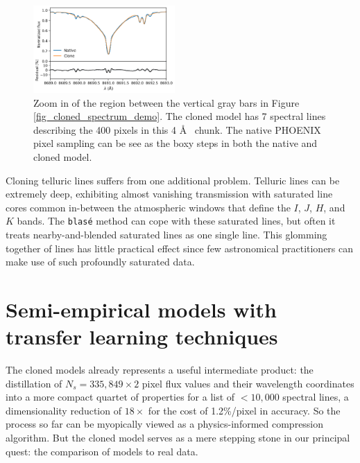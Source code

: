 \documentclass[twocolumn]{aastex631}
\begin{document}
\begin{figure}[hbt!]
    \centering
    \includegraphics[width=0.48\textwidth]{blase_clone_demo_zoom.png}
    \caption{Zoom in of the region between the vertical gray bars in Figure \ref{fig_cloned_spectrum_demo}. The cloned model has 7 spectral lines describing the 400 pixels in this 4 \AA~ chunk.  The native PHOENIX pixel sampling can be see as the boxy steps in both the native and cloned model.  }
    \label{fig_zoom_cloning_performance}
\end{figure}

Cloning telluric lines suffers from one additional problem.  Telluric lines can be extremely deep, exhibiting almost vanishing transmission with saturated line cores common in-between the atmospheric windows that define the $I$, $J$, $H$, and $K$ bands.  The \texttt{blas\'e} method can cope with these saturated lines, but often it treats nearby-and-blended saturated lines as one single line.  This glomming together of lines has little practical effect since few astronomical practitioners can make use of such profoundly saturated data.


\section{Semi-empirical models with transfer learning techniques}\label{transferLearn}


The cloned models already represents a useful intermediate product: the distillation of $N_s=335,849\times2$ pixel flux values and their wavelength coordinates into a more compact quartet of properties for a list of $<10,000$ spectral lines, a dimensionality reduction of $18\times$ for the cost of 1.2\%/pixel in accuracy.  So the process so far can be myopically viewed as a physics-informed compression algorithm.  But the cloned model serves as a mere stepping stone in our principal quest: the comparison of models to real data.
\end{document}
